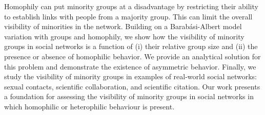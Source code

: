 


Homophily can put minority groups at a disadvantage by restricting their ability to establish links with people from a majority group. This can limit the overall visibility of minorities in the network. Building on a Barab\'{a}si-Albert model variation with groups and homophily, we show how the visibility of minority groups in social networks is a function of (i) their relative group size and (ii) the presence or absence of homophilic behavior. We provide an analytical solution for this problem and demonstrate the existence of asymmetric behavior. Finally, we study the visibility of minority groups in examples of real-world social networks: sexual contacts, scientific collaboration, and scientific citation. Our work presents a foundation for assessing the visibility of minority groups in social networks in which homophilic or heterophilic behaviour is present. %









